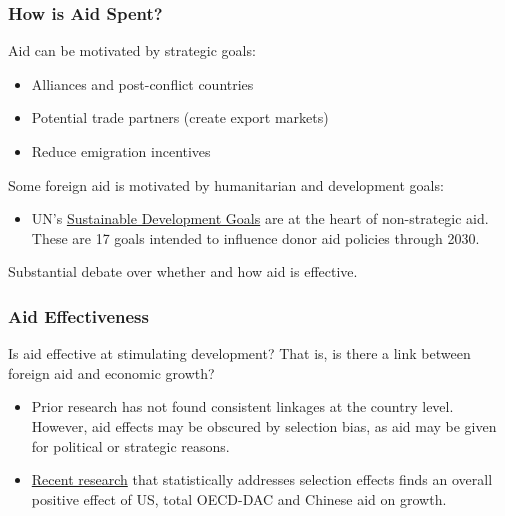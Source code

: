 \documentclass{beamer}
\begin{document}
\begin{frame} 
	\frametitle{\LARGE{How is Aid Spent?}}
	\begin{itemize}
		\large{
			\item Aid can be motivated by strategic goals: \pause 
			\begin{itemize}
			    \item Alliances and post-conflict countries \pause 
			    \item Potential trade partners (create export markets) \pause 
			    \item Reduce emigration incentives \pause 
			\end{itemize}
			\item Some foreign aid is motivated by humanitarian and development goals: \pause 
			\begin{itemize}
			    \item UN's \href{https://www.un.org/sustainabledevelopment/sustainable-development-goals/}{Sustainable Development Goals} are at the heart of non-strategic aid. These are 17 goals intended to influence donor aid policies through 2030. \pause 
			\end{itemize}
		\item Substantial debate over whether and how aid is effective.
		}
	\end{itemize}
\end{frame}

\begin{frame} 
	\frametitle{\LARGE{Aid Effectiveness}}
Is aid effective at stimulating development? That is, is there a link between foreign aid and economic growth? \pause
	\begin{itemize}

		\item Prior research has not found consistent linkages at the country level. However, aid effects may be obscured by selection bias, as aid may be given for political or strategic reasons. \pause
		\item \href{https://www.aiddata.org/publications/aid-china-and-growth-evidence-from-a-new-global-development-finance-dataset}{Recent research} that statistically addresses selection effects finds an overall positive effect of US, total OECD-DAC and Chinese aid on growth.
	\end{itemize}
\end{frame}
\end{document}
